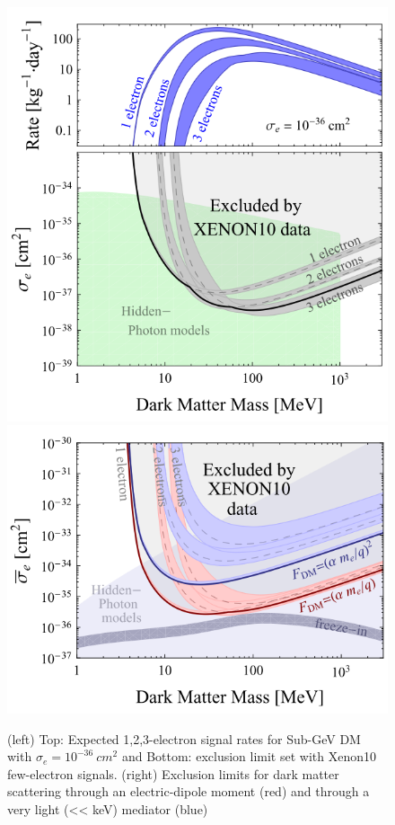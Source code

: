 \begin{figure}[htbp]
\begin{center}
\includegraphics[width=\halffig]{figures/lxetpcs/subGeV.png}
\includegraphics[width=\halffig]{figures/lxetpcs/subGeV2.png}
\caption{(left) Top: Expected 1,2,3-electron signal rates for Sub-GeV DM with $\sigma_{e} = 10^{-36}~cm^{2}$ and Bottom: exclusion limit set with Xenon10 few-electron signals. (right) Exclusion limits for dark matter scattering through an electric-dipole moment (red) and through a very light (<< keV) mediator (blue) }
\label{fig:subGeV}
\end{center}
\end{figure}


